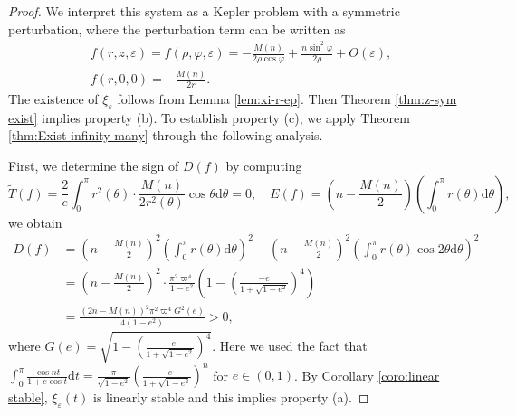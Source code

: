 \documentclass[11pt]{amsart}
\newcommand{\ep}{\varepsilon}
\newcommand{\om}{\varpi}
\begin{document}
\begin{proof}
We interpret this system as a Kepler problem with a symmetric perturbation, where the perturbation term can be written as
\begin{equation*}
	\begin{aligned}
		&f(r,z,\ep)=f(\rho,\varphi,\ep)=-\frac{M(n)}{2\rho\cos\varphi}+\frac{n\sin^{2}\varphi}{2\rho}+O(\ep),\\
		&f(r,0,0)=-\frac{M(n)}{2r}.
	\end{aligned}
\end{equation*}
The existence of $\xi_{\ep}$ follows from Lemma \ref{lem:xi-r-ep}. Then Theorem \ref{thm:z-sym exist} implies property (b). To establish property (c), we apply Theorem \ref{thm:Exist infinity many} through the following analysis.

First, we determine the sign of $D(f)$ by computing
\begin{equation*}
	\tilde{T}(f)=\frac{2}{e}\int_{0}^{\pi} r^{2}(\theta)\cdot\frac{M(n)}{2r^{2}(\theta)}\cos\theta\mathrm{d}\theta=0,\quad E(f)=\left( n-\frac{M(n)}{2}\right)\left(\int_{0}^{\pi}r(\theta)\mathrm{d}\theta\right),
\end{equation*}
we obtain
\begin{equation*}
	\begin{aligned}			
		D(f)&=\left( n-\frac{M(n)}{2}\right)^{2}\left(\int_{0}^{\pi}r(\theta)\mathrm{d}\theta\right)^{2}-\left( n-\frac{M(n)}{2}\right)^{2}\left(\int_{0}^{\pi}r(\theta) \cos2\theta\mathrm{d}\theta\right)^{2}\\
		&=\left( n-\frac{M(n)}{2}\right)^{2}\cdot\frac{\pi^{2}\om^{4}}{1-e^2}\left(1-\left(\frac{-e}{1+\sqrt{1-e^2}}\right)^4\right)\\
		&=\frac{(2n-M(n))^2\pi^{2}\om^{4}G^2(e)}{4(1-e^2)}>0,
	\end{aligned}
\end{equation*}
where $G(e)=\sqrt{1-\left(\frac{-e}{1+\sqrt{1-e^2}}\right)^4}$. Here we used the fact that $\int_{0}^{\pi}\frac{\cos nt}{1+e\cos t}\mathrm{d}t=\frac{\pi}{\sqrt{1-e^2}}\left(\frac{-e}{1+\sqrt{1-e^2}}\right)^n$ for $e\in(0,1)$. By Corollary \ref{coro:linear stable}, $\xi_{\ep}(t)$ is linearly stable and this implies property (a).


\end{proof}
\end{document}
